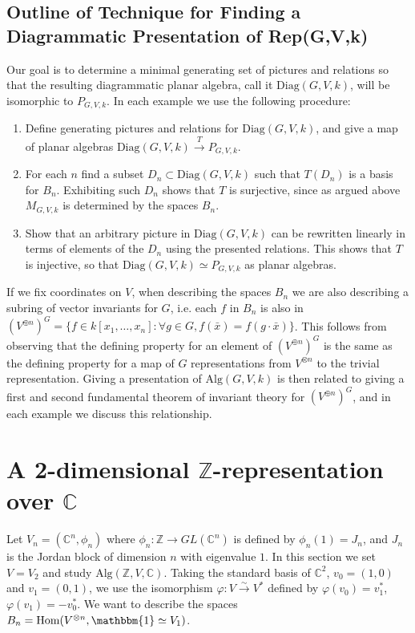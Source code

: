 \documentclass[11pt]{article} %
\begin{document}
\subsection{Outline of Technique for Finding a Diagrammatic Presentation of Rep(G,V,k)}
 Our goal is to determine a minimal generating set of pictures and relations so that the resulting diagrammatic planar algebra, call it $\text{Diag}{(G,V,k)}$, will be isomorphic to $P_{G,V,k}$. In each example we use the following procedure:
 \begin{enumerate}
 \item Define generating pictures and relations for $\text{Diag}{(G,V,k)}$, and give a map of planar algebras $\text{Diag}{(G,V,k)} \xrightarrow{T} P_{G,V,k}$.
 \item For each $n$ find a subset $D_n \subset \text{Diag}{(G,V,k)}$ such that $T(D_n)$ is a basis for $B_n$. Exhibiting such $D_n$ shows that $T$ is surjective, since as argued above $M_{G,V,k}$ is determined by the spaces $B_n$.
 \item Show that an arbitrary picture in $\text{Diag}{(G,V,k)}$ can be rewritten linearly in terms of elements of the $D_n$ using the presented relations. This shows that $T$ is injective, so that $\text{Diag}{(G,V,k)} \simeq P_{G,V,k}$ as planar algebras. 
 
 \end{enumerate}

If we fix coordinates on $V$, when describing the spaces $B_n$ we are also describing a subring of vector invariants for $G$, i.e. each $f$ in $B_n$ is also in $(V^{\oplus n})^G=\{f \in k[x_1,\ldots,x_n] : \forall g \in G, f(\bar{x}) = f(g \cdot \bar{x})\}$. This follows from observing that the defining property for an element of $(V^{\oplus n})^G$ is the same as the defining property for a map of $G$ representations from $V^{\otimes n}$ to the trivial representation. Giving a presentation of $\text{Alg}{(G,V,k)}$ is then related to giving a first and second fundamental theorem of invariant theory for $(V^{\oplus n})^G$, and in each example we discuss this relationship.



\section{A 2-dimensional $\mathbb{Z}$-representation over $\mathbb{C}$}

Let $V_n=(\mathbb{C}^n,\phi_n)$ where $\phi_n: \mathbb{Z} \rightarrow GL(\mathbb{C}^n)$ is defined by $\phi_n(1)=J_n$, and $J_n$ is the Jordan block of dimension $n$ with eigenvalue $1$. In this section we set $V=V_2$ and study $\text{Alg}{(\mathbb{Z},V, \mathbb{C})}$. Taking the standard basis of $\mathbb{C}^2$, $v_0 = (1,0)$ and  $v_1 = (0,1)$, we use the isomorphism $\varphi:V \xrightarrow{\sim} V^{\ast}$ defined by $\varphi(v_0)=v_1^{\ast}$, $\varphi(v_1)=-v_0^{\ast}$. We want to describe the spaces $B_n = \text{Hom}(V^{\otimes n},\mathbbm{1} \simeq V_1)$.
\end{document}

